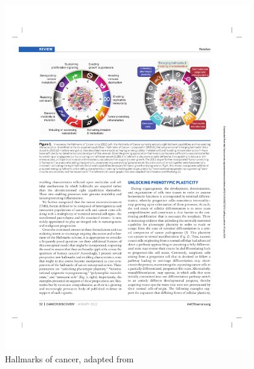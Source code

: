 \begin{figure}
  \begin{center}
  \includegraphics[width=0.95\textwidth]{figures/introduction/hallmarks.pdf}
  \end{center}
  \caption{Hallmarks of cancer, adapted from \cite{hanahan2011}}
  \label{fig:hallmarks}
\end{figure}


